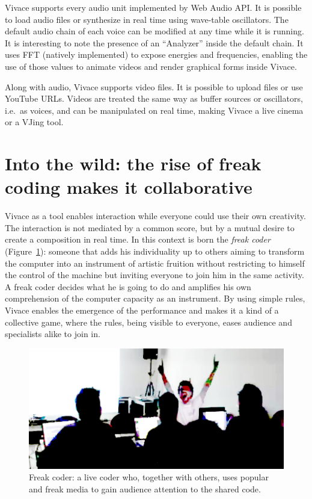 \documentclass[letterpaper, 12pt]{article}
\begin{document}
{Vivace supports every audio unit implemented by Web Audio API. It is
possible to load audio files or synthesize in real time using
wave-table oscillators. The default audio chain of each voice can be
modified at any time while it is running. It is interesting to note
the presence of an ``Analyzer'' inside the default chain. It uses FFT
(natively implemented) to expose energies and frequencies, enabling
the use of those values to animate videos and render graphical forms
inside Vivace.

Along with audio, Vivace supports video files. It is possible to
upload files or use YouTube URLs. Videos are treated the same way as
buffer sources or oscillators, i.e.\ as voices, and can be manipulated
on real time, making Vivace a live cinema or a VJing tool.

\section{Into the wild: the rise of freak coding makes it collaborative}

Vivace as a tool enables interaction while everyone could use their
own creativity. The interaction is not mediated by a common score, but
by a mutual desire to create a composition in real time. In this
context is born the \emph{freak coder} (Figure~\ref{fig:freakcoder}):
someone that adds his individuality up to others aiming to transform
the computer into an instrument of artistic fruition without
restricting to himself the control of the machine but inviting
everyone to join him in the same activity. A freak coder decides what
he is going to do and amplifies his own comprehension of the computer
capacity as an instrument. By using simple rules, Vivace enables the
emergence of the performance and makes it a kind of a collective game,
where the rules, being visible to everyone, eases audience and
specialists alike to join in.

\begin{figure}[htpb]
  \begin{center}
    \includegraphics[scale=.4]{img/fig_freakcoder.png}
    \caption{Freak coder: a live coder who, together with others, uses
      popular and freak media to gain audience attention to the shared
      code.}
    \label{fig:freakcoder}
  \end{center}
\end{figure}

}
\end{document}
